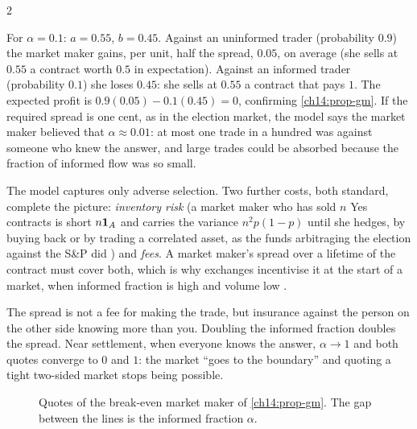 \begin{paracol}{2}
\begin{example}
For $\alpha=0.1$: $a=0.55$, $b=0.45$. Against an uninformed trader (probability $0.9$) the market maker gains, per unit, half the spread, $0.05$, on average
(she sells at $0.55$ a contract worth $0.5$ in expectation). Against an informed trader (probability $0.1$) she
loses $0.45$: she sells at $0.55$ a contract that pays $1$. The expected profit is $0.9(0.05)-0.1(0.45)=0$, confirming
\cref{ch14:prop-gm}. If the required spread is one cent, as in the election market, the model says the market maker
believed that $\alpha\approx0.01$: at most one trade in a hundred was against someone who knew the answer, and
large trades could be absorbed because the fraction of informed flow was so small.
\end{example}

The model captures only adverse selection. Two further costs, both standard, complete the picture:
\emph{inventory risk} (a market maker who has sold $n$ Yes contracts is short $n\mathbf{1}_A$ and carries the variance
$n^2p(1-p)$ until she hedges, by buying back or by trading a correlated asset, as the funds arbitraging the election
against the S\&P did ) and \emph{fees}. A
market maker's spread over a lifetime of the contract must cover both, which is why exchanges incentivise it
at the start of a market, when informed fraction is high and volume low .

\begin{intuition}
The spread is not a fee for making the trade, but insurance against the person on the other side knowing more than you.
Doubling the informed fraction doubles the spread. Near settlement, when everyone knows the answer, $\alpha\to1$ and
both quotes converge to $0$ and $1$: the market ``goes to the boundary'' and quoting a tight two-sided market stops being possible.
\end{intuition}

\begin{figure}[ht]
\centering
{}
\caption{Quotes of the break-even market maker of \cref{ch14:prop-gm}. The gap between the lines is the informed fraction $\alpha$.}
\label{ch14:fig-quotes}
\end{figure}


\end{paracol}
